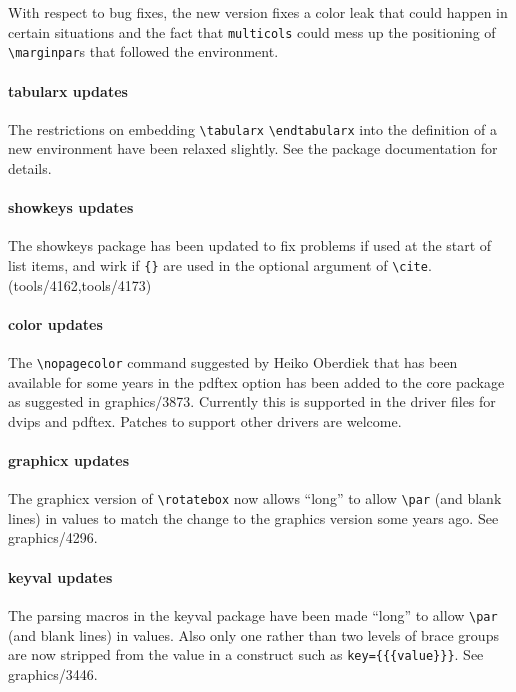 \documentclass{ltnews}
\begin{document}
With respect to bug fixes, the new version fixes a color leak that
could happen in certain situations and the fact that
\texttt{multicols} could mess up the positioning of
\verb=\marginpar=s that followed the environment.

\paragraph{\textsf{tabularx} updates}

The restrictions on embedding \verb|\tabularx| \verb|\endtabularx|
into the definition of a new environment have been relaxed
slightly. See the package documentation for details.

\paragraph{\textsf{showkeys} updates}

The \textsf{showkeys} package has been updated to fix problems if used
at the start of list items, and wirk if \verb|{}| are used in the
optional argument of \verb|\cite|. (tools/4162,tools/4173)


\paragraph{\textsf{color} updates}

The \verb|\nopagecolor| command suggested by Heiko Oberdiek that has
been available for some years in the \textsf{pdftex} option has been
added to the core package as suggested in graphics/3873. Currently
this is supported in the driver files for \textsf{dvips} and
\textsf{pdftex}.  Patches to support other drivers are welcome.

 \paragraph{\textsf{graphicx} updates}

The \textsf{graphicx} version of \verb|\rotatebox| now allows ``long''
to allow \verb|\par| (and blank lines) in values to match the change
to the \textsf{graphics} version some years ago. See graphics/4296.

\paragraph{\textsf{keyval} updates}

The parsing macros in the \textsf{keyval} package have been made
``long'' to allow \verb|\par| (and blank lines) in values. Also only
one rather than two levels of brace groups are now stripped from the
value in a construct such as \verb|key={{{value}}}|. See
graphics/3446.
\end{document}
